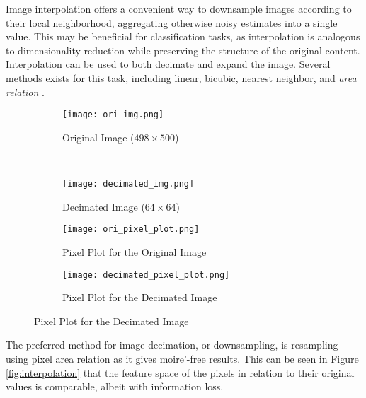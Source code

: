 \documentclass{article}
\begin{document}
Image interpolation offers a convenient way to downsample images according to
their local neighborhood, aggregating otherwise noisy estimates into a single
value. This may be beneficial for classification tasks, as interpolation is
analogous to dimensionality reduction while preserving the structure of
the original content.
Interpolation can be used to both decimate and expand the image. Several
methods exists for this task, including linear, bicubic, nearest neighbor, and
\textit{area relation} \cite{opencv}.

\begin{figure}[h!]
  \centering
  \caption{Results of Interpolating a 249,000 pixel image to a 4,096 pixel image.}
  \vspace{-5pt}
  \label{fig:interpolation}
  \begin{subfigure}[b]{0.45\textwidth}
    \centering
    \texttt{[image: ori\_img.png]}
    \vspace{-10pt}
    \caption{Original Image ($498 \times 500$)}
    \label{fig:ori-image}
  \end{subfigure}
  ~
  \begin{subfigure}[b]{0.45\textwidth}
    \centering
    \texttt{[image: decimated\_img.png]}
    \vspace{-10pt}
    \caption{Decimated Image ($64 \times 64$)}
    \label{fig:reduced-img}
  \end{subfigure}

  \begin{subfigure}[b]{0.45\textwidth}
    \centering
    \texttt{[image: ori\_pixel\_plot.png]}
    \caption{Pixel Plot for the Original Image}
    \label{fig:ori-pixel-plot}
  \end{subfigure}
  \begin{subfigure}[b]{0.45\textwidth}
    \centering
    \texttt{[image: decimated\_pixel\_plot.png]}
    \caption{Pixel Plot for the Decimated Image}
    \label{fig:reduced-pixel-plot}
  \end{subfigure}
\end{figure}

The preferred method for image decimation, or downsampling, is
resampling using pixel area relation as it gives moire'-free results. This can be
seen in Figure \ref{fig:interpolation} that the feature space of the pixels in
relation to their original values is comparable, albeit with information loss.

\end{document}
